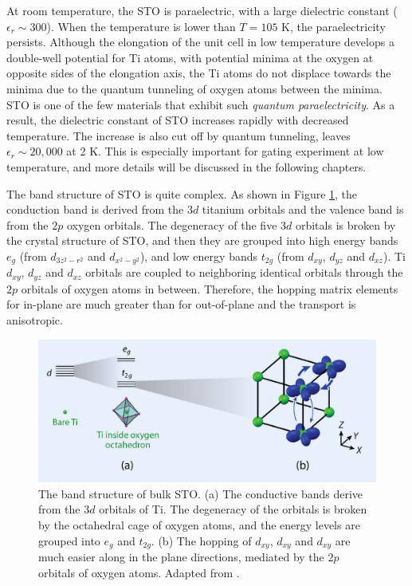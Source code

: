 \documentclass[pdflatex, sectionletters, 12pt]{pittetd}    %
\begin{document}
At room temperature, the STO is paraelectric, with a large dielectric constant ($\epsilon_r \sim 300$).  When the temperature is lower than $T=105$ K, the paraelectricity persists. Although the elongation of the unit cell in low temperature develops a double-well potential for Ti atoms, with potential minima at the oxygen at opposite sides of the elongation axis, the Ti atoms do not displace towards the minima due to the quantum tunneling of oxygen atoms\cite{sulpizio2014nanoscale} between the minima. STO is one of the few materials that exhibit such \emph{quantum paraelectricity}\cite{muller1979srti}. As a result, the dielectric constant of STO increases rapidly with decreased temperature. The increase is also cut off by quantum tunneling, leaves $\epsilon_r \sim 20,000$\cite{sakudo1971dielectric} at 2 K. This is especially important for gating experiment at low temperature, and more details will be discussed in the following chapters.

The band structure of STO is quite complex. As shown in Figure \ref{FIG:STOBand}, the conduction band is derived from the $3d$ titanium orbitals and the valence band is from the $2p$ oxygen orbitals. The degeneracy of the five $3d$ orbitals is broken by the crystal structure of STO, and then they are grouped into high energy bands $e_g$ (from $d_{3z^2 - r^2}$ and $d_{x^2-y^2}$), and low energy bands $t_{2g}$ (from $d_{xy}$, $d_{yz}$ and $d_{xz}$). Ti $d_{xy}$, $d_{yz}$ and $d_{xz}$ orbitals are coupled to neighboring identical orbitals through the $2p$ orbitals of oxygen atoms in between. Therefore, the hopping matrix elements for in-plane are much greater than for out-of-plane and the transport is anisotropic\cite{sulpizio2014nanoscale}. 

\begin{figure}[h!]
	\centering
	\includegraphics[width=.90\textwidth]{Drawing/STOBand.pdf}
	\caption{The band structure of bulk STO. (a) The conductive bands derive from the $3d$ orbitals of Ti. The degeneracy of the orbitals is broken by the octahedral cage of oxygen atoms, and the energy levels are grouped into $e_g$ and $t_{2g}$. (b) The hopping of $d_{xy}$, $d_{xy}$ and $d_{xy}$ are much easier along in the plane directions, mediated by the $2p$ orbitals of oxygen atoms. Adapted from \cite{sulpizio2014nanoscale}.}
	\label{FIG:STOBand}
\end{figure}
\end{document}
